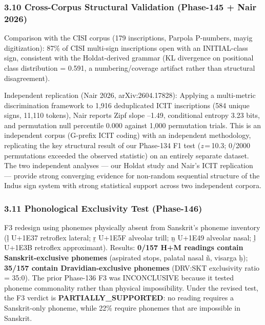 \documentclass[
]{article}
\begin{document}
\subsubsection{3.10 Cross-Corpus Structural Validation (Phase-145 + Nair
2026)}\label{cross-corpus-structural-validation-phase-145-nair-2026}

Comparison with the CISI corpus (179 inscriptions, Parpola P-numbers,
mayig digitization): 87\% of CISI multi-sign inscriptions open with an
INITIAL-class sign, consistent with the Holdat-derived grammar (KL
divergence on positional class distribution = 0.591, a
numbering/coverage artifact rather than structural disagreement).

Independent replication (Nair 2026, arXiv:2604.17828): Applying a
multi-metric discrimination framework to 1,916 deduplicated ICIT
inscriptions (584 unique signs, 11,110 tokens), Nair reports Zipf slope
--1.49, conditional entropy 3.23 bits, and permutation null percentile
0.000 against 1,000 permutation trials. This is an independent corpus
(G-prefix ICIT coding) with an independent methodology, replicating the key structural result of our Phase-134 F1 test (\textit{z}\,=\,10.3; 0/2000 permutations exceeded the observed statistic) on an
entirely separate dataset. The two independent analyses --- our Holdat study and Nair's ICIT replication --- provide strong converging evidence for non-random
sequential structure of the Indus sign system with strong statistical support across two independent corpora.

\subsubsection{3.11 Phonological Exclusivity Test
(Phase-146)}\label{phonological-exclusivity-test-phase-146}

F3 redesign using phonemes physically absent from Sanskrit's phoneme
inventory (ḷ U+1E37 retroflex lateral; ṟ U+1E5F alveolar trill; ṉ U+1E49
alveolar nasal; ḻ U+1E3B retroflex approximant). Results: \textbf{0/157
H+M readings contain Sanskrit-exclusive phonemes} (aspirated stops,
palatal nasal ñ, visarga ḥ); \textbf{35/157 contain Dravidian-exclusive
phonemes} (DRV:SKT exclusivity ratio = 35:0). The prior Phase-136 F3 was
INCONCLUSIVE because it tested phoneme commonality rather than physical
impossibility. Under the revised test, the F3 verdict is
\textbf{PARTIALLY\_SUPPORTED}: no reading requires a Sanskrit-only
phoneme, while 22\% require phonemes that are impossible in Sanskrit.
\end{document}
